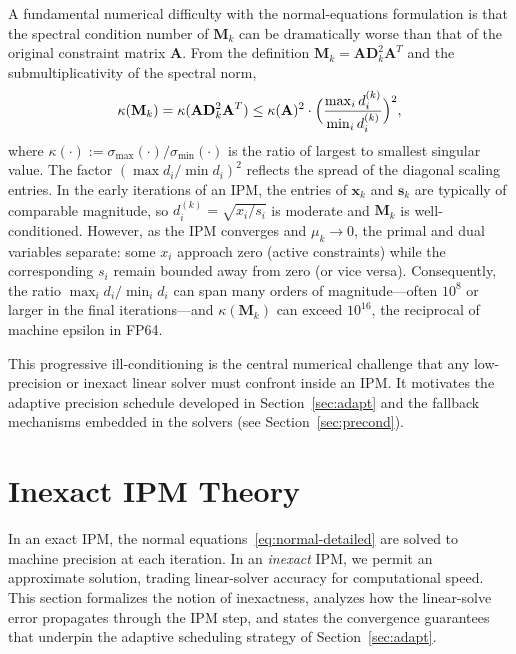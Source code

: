 \documentclass[11pt,twoside]{article}
\newcommand{\bA}{\mathbf{A}}
\newcommand{\bx}{\mathbf{x}}
\newcommand{\bs}{\mathbf{s}}
\newcommand{\bD}{\mathbf{D}}
\newcommand{\bM}{\mathbf{M}}
\newcommand{\cond}{\kappa}
\begin{document}
A fundamental numerical difficulty with the normal-equations formulation
is that the spectral condition number of $\bM_k$ can be dramatically worse
than that of the original constraint matrix $\bA$.  From the definition
$\bM_k = \bA\bD_k^2\bA^T$ and the submultiplicativity of the spectral
norm,
\begin{equation}
  \cond(\bM_k) = \cond(\bA\bD_k^2\bA^T)
    \le \cond(\bA)^2 \cdot
    \Bigl(\frac{\max_i d_i^{(k)}}{\min_i d_i^{(k)}}\Bigr)^2,
  \label{eq:cond-bound}
\end{equation}
where $\cond(\cdot) := \sigma_{\max}(\cdot) / \sigma_{\min}(\cdot)$ is the
ratio of largest to smallest singular value.  The factor $(\max d_i /
\min d_i)^2$ reflects the spread of the diagonal scaling entries.  In the
early iterations of an IPM, the entries of $\bx_k$ and $\bs_k$ are
typically of comparable magnitude, so $d_i^{(k)} = \sqrt{x_i/s_i}$ is
moderate and $\bM_k$ is well-conditioned.  However, as the IPM converges
and $\mu_k \to 0$, the primal and dual variables separate: some $x_i$
approach zero (active constraints) while the corresponding $s_i$ remain
bounded away from zero (or vice versa).  Consequently, the ratio
$\max_i d_i / \min_i d_i$ can span many orders of magnitude—often $10^8$
or larger in the final iterations—and $\cond(\bM_k)$ can exceed
$10^{16}$, the reciprocal of machine epsilon in FP64.

This progressive ill-conditioning is the central numerical challenge that
any low-precision or inexact linear solver must confront inside an IPM.
It motivates the adaptive precision schedule developed in
Section~\ref{sec:adapt} and the fallback mechanisms embedded in the
solvers (see Section~\ref{sec:precond}).

\section{Inexact IPM Theory}
\label{sec:theory}

In an exact IPM, the normal equations~\eqref{eq:normal-detailed} are solved
to machine precision at each iteration.  In an \emph{inexact} IPM, we permit
an approximate solution, trading linear-solver accuracy for computational
speed.  This section formalizes the notion of inexactness, analyzes how the
linear-solve error propagates through the IPM step, and states the
convergence guarantees that underpin the adaptive scheduling strategy of
Section~\ref{sec:adapt}.
\end{document}
